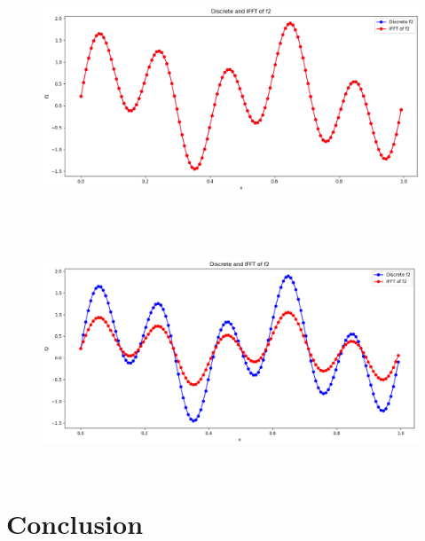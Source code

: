 \documentclass{ctexart}
\begin{document}
						\begin{figure}[H]
							\centering 
							\includegraphics[height=7cm,width=14cm]{5.png}
							\end{figure}
							\begin{figure}[H]
								\centering 
								\includegraphics[height=7cm,width=14cm]{6.png}
								\end{figure}
		\section{Conclusion}
    
\end{document}
